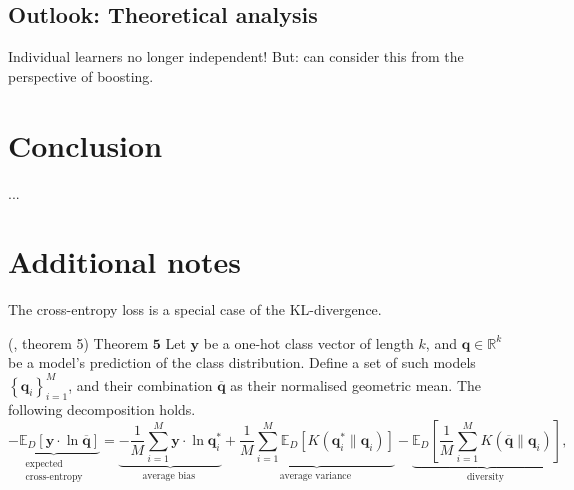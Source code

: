 \documentclass[
    a4paper, %
	fontsize=10pt, %
	twoside=false, %
]{kaobook}
\begin{document}
\section{Outlook: Theoretical analysis}

Individual learners no longer independent! But: can consider this from the perspective of boosting.


\chapter{Conclusion}
...



\appendix %


\chapter{Additional notes}

The cross-entropy loss is a special case of the KL-divergence.
\begin{lemma} (\cite{wood23}, theorem 5) \label{thm:cross-entropy-decomp}
    Theorem $\mathbf{5}$ Let $\mathbf{y}$ be a one-hot class vector of length $k$, and $\mathbf{q} \in \mathbb{R}^k$ be a model's prediction of the class distribution. Define a set of such models $\left\{\mathbf{q}_i\right\}_{i=1}^M$, and their combination $\overline{\mathbf{q}}$ as their normalised geometric mean. The following decomposition holds.
    $$
    \underbrace{-\mathbb{E}_D[\mathbf{y} \cdot \ln \overline{\mathbf{q}}]}_{\begin{array}{c}
    \text { expected } \\
    \text { cross-entropy }
    \end{array}}=\underbrace{-\frac{1}{M} \sum_{i=1}^M \mathbf{y} \cdot \ln \mathbf{q}_i^*}_{\text {average bias }}+\underbrace{\frac{1}{M} \sum_{i=1}^M \mathbb{E}_D\left[K\left(\mathbf{q}_i^* \| \mathbf{q}_i\right)\right]}_{\text {average variance }}-\underbrace{\mathbb{E}_D\left[\frac{1}{M} \sum_{i=1}^M K\left(\overline{\mathbf{q}} \| \mathbf{q}_i\right)\right]}_{\text {diversity }},
    $$
\end{lemma}
\end{document}
